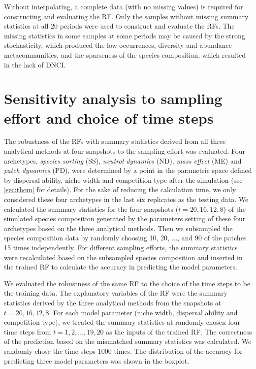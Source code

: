 	Without interpolating, a complete data (with no missing values) is required for constructing and evaluating the RF. Only the samples without missing summary statistics at all 20 periods were used to construct and evaluate the RFs. The missing statistics in some samples at some periods may be caused by the strong stochasticity, which produced the low occurrences, diversity and abundance metacommunities, and the sparseness of the species composition, which resulted in the lack of DNCI.
	
	\section{Sensitivity analysis to sampling effort and choice of time steps}
	\noindent
	The robustness of the RFs with summary statistics derived from all three analytical methods at four snapshots to the sampling effort was evaluated. Four archetypes, \textit{species sorting} (SS), \textit{neutral dynamics} (ND), \textit{mass effect} (ME) and \textit{patch dynamics} (PD), were determined by a point in the parametric space defined by dispersal ability, niche width and competition type after the simulation (see \autoref{sec:thom} for details). For the sake of reducing the calculation time, we only considered these four archetypes in the last six replicates as the testing data. We calculated the summary statistics for the four snapshots ($t = 20, 16, 12, 8$) of the simulated species composition generated by the parameters setting of these four archetypes based on the three analytical methods. Then we subsampled the species composition data by randomly choosing 10, 20, ..., and 90 of the patches 15 times independently. For different sampling efforts, the summary statistics were recalculated based on the subsampled species composition and inserted in the trained RF to calculate the accuracy in predicting the model parameters.
	
	We evaluated the robustness of the same RF to the choice of the time steps to be the training data. The explanatory variables of the RF were the summary statistics derived by the three analytical methods from the snapshots at $t = 20, 16, 12, 8$. For each model parameter (niche width, dispersal ability and competition type), we treated the summary statistics at randomly chosen four time steps from $t = 1, 2,\dots, 19, 20$ as the inputs of the trained RF. The correctness of the prediction based on the mismatched summary statistics was calculated. We randomly chose the time steps 1000 times. The distribution of the accuracy for predicting three model parameters was shown in the boxplot.
	
